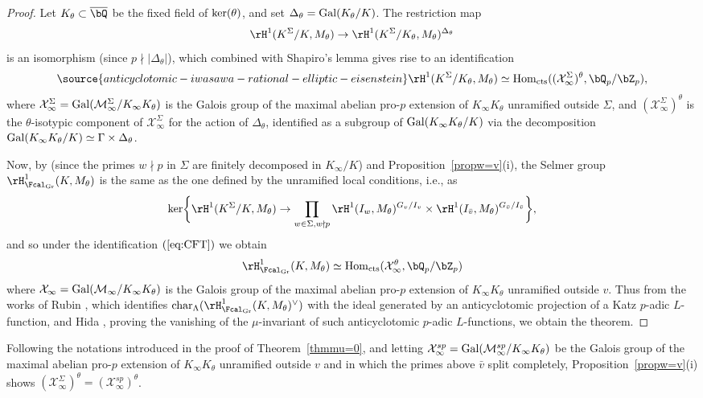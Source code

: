 \begin{proof}
Let $K_\theta\subset\overline{\bQ}$ be the fixed field of ${\rm ker}(\theta)$, and set $\Delta_\theta={\rm Gal}(K_\theta/K)$. The restriction map
\[
\rH^1(K^\Sigma/K,M_\theta)\rightarrow\rH^1(K^\Sigma/K_\theta,M_\theta)^{\Delta_\theta}
\]
is an isomorphism (since $p\nmid\vert\Delta_\theta\vert$), which combined with Shapiro's lemma gives rise to an identification
\begin{equation}\label{eq:CFT}
\source{anticyclotomic-iwasawa-rational-elliptic-eisenstein}
\rH^1(K^\Sigma/K_\theta,M_\theta)
\simeq{\rm Hom}_{\rm cts}((\mathcal{X}_\infty^\Sigma)^\theta,\bQ_p/\bZ_p),
\end{equation}
where $\mathcal{X}_\infty^\Sigma={\rm Gal}(\mathcal{M}_\infty^\Sigma/K_\infty K_\theta)$ is the Galois group of the maximal abelian pro-$p$ extension of $K_\infty K_\theta$ unramified outside $\Sigma$, and $(\mathcal{X}_\infty^\Sigma)^\theta$ is the $\theta$-isotypic component of $\mathcal{X}_\infty^\Sigma$ for the action of $\Delta_\theta$, identified as a subgroup of ${\rm Gal}(K_\infty K_\theta/K)$ via the decomposition ${\rm Gal}(K_\infty K_\theta/K)\simeq\Gamma\times\Delta_\theta$.

Now, by \cite[Rem.~3.2]{pollack2011anticyclotomic} (since the primes $w\nmid p$ in $\Sigma$ are finitely decomposed in $K_\infty/K$) and Proposition~\ref{propw=v}(i), the Selmer group $\rH^1_{\Fcal_{\rm Gr}}(K,M_\theta)$ is the same as the one defined by the unramified local conditions, i.e., as
\[
\ker\biggr\{\rH^1(K^\Sigma/K,M_\theta)\rightarrow\prod_{w \in \Sigma, w \nmid p}\rH^1(I_w,M_\theta)^{G_v/I_v}\times\rH^1(I_{\bar{v}},M_\theta)^{G_{\bar{v}}/I_{\bar{v}}}\biggr\},
\]
and so under the identification $(\ref{eq:CFT})$ we obtain
\[
\rH^1_{\Fcal_{\rm Gr}}(K,M_\theta)\simeq{\rm Hom}_{\rm cts}(\mathcal{X}_\infty^\theta,\bQ_p/\bZ_p)
\]
where $\mathcal{X}_\infty={\rm Gal}(\mathcal{M}_\infty/K_\infty K_\theta)$ is the Galois group of the maximal abelian pro-$p$ extension of $K_\infty K_\theta$ unramified outside $v$. Thus from the works of  Rubin \cite{rubinmainconj},
which identifies $\mathrm{char}_\Lambda(\rH^1_{\Fcal_{\rm Gr}}(K,M_\theta)^\vee)$ with the ideal generated by an anticyclotomic projection of a Katz $p$-adic $L$-function,
and Hida \cite{hidamu-0}, proving the vanishing of the $\mu$-invariant of such anticyclotomic $p$-adic $L$-functions, we obtain the theorem.
\end{proof}

\begin{remark}
\notready
Following the notations introduced in the proof of Theorem~\ref{thmmu=0}, and letting $\mathcal{X}_\infty^{sp}={\rm Gal}(\mathcal{M}_\infty^{sp}/K_\infty K_\theta)$ be the Galois group of the maximal abelian pro-$p$ extension of $K_\infty K_\theta$ unramified outside $v$ and in which the primes above $\bar{v}$ split completely, Proposition~\ref{propw=v}(i) shows $(\mathcal{X}_\infty^\Sigma)^\theta=(\mathcal{X}_\infty^{sp})^\theta$.
\end{remark}

